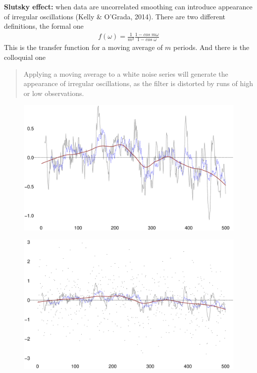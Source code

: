 \documentclass{beamer}
\begin{document}
\begin{frame}
  \textbf{Slutsky effect:} when data are uncorrelated smoothing can introduce appearance of irregular oscillations (Kelly \& O'Grada, 2014).
  There are two different definitions, the formal one
  \begin{align}
     f(\omega)=\frac{1}{m^2} \frac{1-cos\;m\omega}{1-cos\;\omega}     
   \end{align} 
   \medskip
   This is the transfer function for a moving average of $m$ periods.
   And there is the colloquial one
   \begin{quote}
     Applying a moving average to a white noise series will generate the appearance of irregular oscillations, as the filter is distorted by runs of high or low observations.
   \end{quote}
\end{frame}


\begin{frame}
  \begin{figure}
    \includegraphics[scale=.3]{slutsky.eps}
  \end{figure}
\end{frame}

\begin{frame}
  \begin{figure}
    \includegraphics[scale=.3]{slutsky2.eps}
  \end{figure}
\end{frame}
\end{document}
